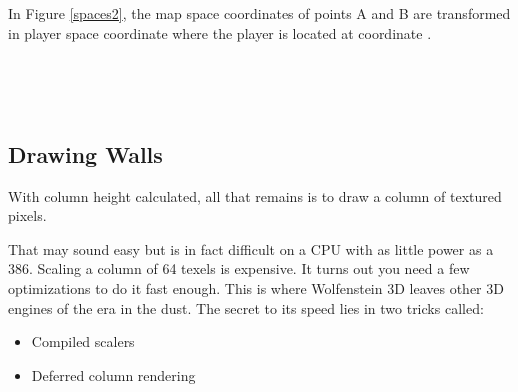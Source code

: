 \par
{}
\par
In Figure \ref{spaces2}, the map space coordinates of points A and B are transformed in player space coordinate where the player is located at coordinate .\\





 \begin{minipage}{\textwidth}
 
\centering
\vspace*{0.5cm}\\
\centering
\label{fish_eye_corrected}

 \end{minipage}


 \par
 
 \begin{minipage}{\textwidth}
\centering
\vspace*{0.5cm}\\
\centering
 \label{wolf3d_7_fullframe}
\end{minipage}











\subsection{Drawing Walls}
With column height calculated, all that remains is to draw a column of textured pixels.\\
\par
That may sound easy but is in fact difficult on a CPU with as little power as a 386. Scaling a column of 64 texels is expensive. It turns out you need a few optimizations to do it fast enough. This is where Wolfenstein 3D leaves other 3D engines of the era in the dust. The secret to its speed lies in two tricks called:
\begin{itemize}
\item Compiled scalers
\item Deferred column rendering
\end{itemize}
\par








